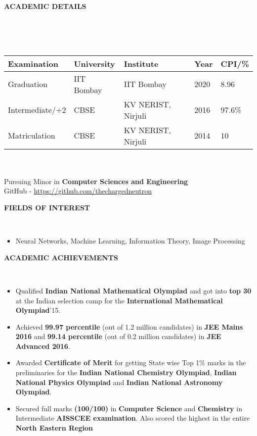 \documentclass[a4paper,10pt]{article}
\newcommand{\lsep}{-0.5cm}
\newcommand{\resheading}[1]{{\small \colorbox{mygrey}{\begin{minipage}{0.975\textwidth}{\textbf{#1 \vphantom{p\^{E}}}}\end{minipage}}}}
\begin{document}
\hspace{0.5cm}\\[-0.2cm]

\indent  \\

\resheading{\textbf{ACADEMIC DETAILS} }\\[\lsep]
\\ \\
\indent \begin{tabular}{ l @{\hskip 0.5in} l @{\hskip 0.6in} l @{\hskip 0.75in} l @{\hskip 1in} l }
\hline
\textbf{Examination} & \textbf{University} & \textbf{Institute } & \textbf{Year} & \textbf{CPI/\%} \\
\hline
Graduation      & IIT Bombay & IIT Bombay & 2020 & 8.96 \\
Intermediate/+2 & CBSE & KV NERIST, Nirjuli   & 2016 & 97.6\%\\
Matriculation & CBSE & KV NERIST, Nirjuli & 2014 & 10\\
\hline
\end{tabular}
\\ \\
\indent \indent Pursuing Minor in \textbf{Computer Sciences and Engineering} \\
\indent \indent GitHub - \href{https://github.com/thechargedneutron}{https://github.com/thechargedneutron}
\\

\resheading {\textbf{FIELDS OF INTEREST} }\\[\lsep]
\begin{itemize}
\item \noindent Neural Networks, Machine Learning, Information Theory, Image Processing
\end{itemize}

\resheading{\textbf{ACADEMIC ACHIEVEMENTS} }\\[\lsep]
\begin{itemize}
\setlength\itemsep{0.05em}
\item \noindent Qualified \textbf{Indian National Mathematical Olympiad} and got into \textbf{top 30} at the Indian selection camp for the \textbf{International Mathematical Olympiad}'15.
\item \noindent Achieved \textbf{99.97 percentile} (out of 1.2 million candidates) in \textbf{JEE Mains 2016} and \textbf{99.14 percentile} (out of 0.2 million candidates) in \textbf{JEE Advanced 2016}.
\item \noindent Awarded \textbf{Certificate of Merit} for getting State wise Top 1\% marks in the preliminaries for the \textbf{Indian National Chemistry Olympiad}, \textbf{Indian National Physics Olympiad} and \textbf{Indian National Astronomy Olympiad}.
\item \noindent Secured full marks \textbf{(100/100)} in \textbf{Computer Science} and \textbf{Chemistry} in Intermediate \textbf{AISSCEE examination}. Also scored the highest in the entire \textbf{North Eastern Region}
\end{itemize}
\end{document}
